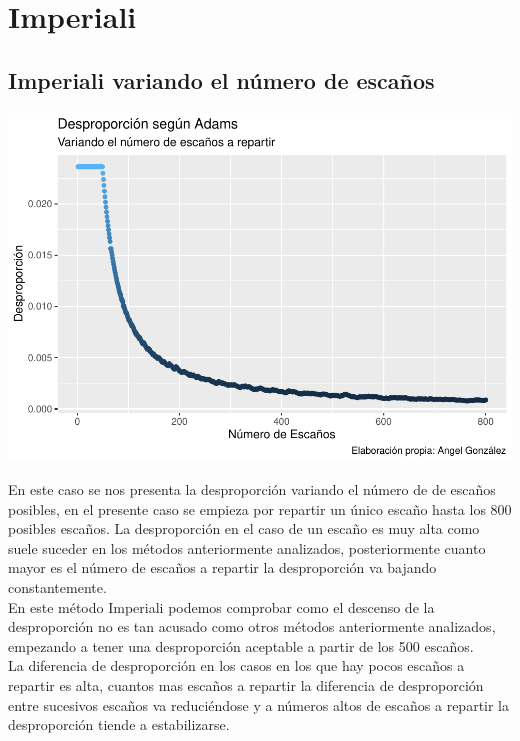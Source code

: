 \documentclass[12pt,a4paper,]{book}
\numberwithin{dummy}{section}
\theoremstyle{ocrenumbox}
\theoremstyle{blacknumex}
\theoremstyle{blacknumbox}
\theoremstyle{ocrenum}
\theoremstyle{ocrenum}
\begin{document}
\hypertarget{imperiali}{%
\section{Imperiali}\label{imperiali}}

\hypertarget{imperiali-variando-el-nuxfamero-de-escauxf1os}{%
\subsection{Imperiali variando el número de
escaños}\label{imperiali-variando-el-nuxfamero-de-escauxf1os}}

\begin{center}\includegraphics[width=0.95\linewidth]{figurasR/unnamed-chunk-31-1} \end{center}

En este caso se nos presenta la desproporción variando el número de de
escaños posibles, en el presente caso se empieza por repartir un único
escaño hasta los 800 posibles escaños. La desproporción en el caso de un
escaño es muy alta como suele suceder en los métodos anteriormente
analizados, posteriormente cuanto mayor es el número de escaños a
repartir la desproporción va bajando constantemente.\\
En este método Imperiali podemos comprobar como el descenso de la
desproporción no es tan acusado como otros métodos anteriormente
analizados, empezando a tener una desproporción aceptable a partir de
los 500 escaños.\\
La diferencia de desproporción en los casos en los que hay pocos escaños
a repartir es alta, cuantos mas escaños a repartir la diferencia de
desproporción entre sucesivos escaños va reduciéndose y a números altos
de escaños a repartir la desproporción tiende a estabilizarse.
\end{document}
